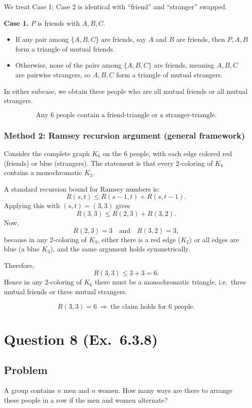 \documentclass[12pt]{article}
\begin{document}
We treat Case 1; Case 2 is identical with ``friend'' and ``stranger'' swapped.

\medskip
\noindent\textbf{Case 1.} $P$ is friends with $A,B,C$.
\begin{itemize}[leftmargin=*]
\item If any pair among $\{A,B,C\}$ are friends, say $A$ and $B$ are friends, then $P,A,B$ form a triangle of mutual friends.
\item Otherwise, none of the pairs among $\{A,B,C\}$ are friends, meaning $A,B,C$ are pairwise strangers, so $A,B,C$ form a triangle of mutual strangers.
\end{itemize}
In either subcase, we obtain three people who are all mutual friends or all mutual strangers.

\[
\boxed{\text{Any }6\text{ people contain a friend-triangle or a stranger-triangle.}}
\]

\subsubsection{Method 2: Ramsey recursion argument (general framework)}
Consider the complete graph $K_6$ on the $6$ people, with each edge colored red (friends) or blue (strangers). The statement is that every 2-coloring of $K_6$ contains a monochromatic $K_3$.

A standard recursion bound for Ramsey numbers is:
\[
R(s,t) \le R(s-1,t) + R(s,t-1).
\]
Applying this with $(s,t)=(3,3)$ gives
\[
R(3,3) \le R(2,3) + R(3,2).
\]
Now,
\[
R(2,3)=3 \quad\text{and}\quad R(3,2)=3,
\]
because in any 2-coloring of $K_3$, either there is a red edge ($K_2$) or all edges are blue (a blue $K_3$), and the same argument holds symmetrically.

Therefore,
\[
R(3,3) \le 3+3 = 6.
\]
Hence in any 2-coloring of $K_6$ there must be a monochromatic triangle, i.e.\ three mutual friends or three mutual strangers.

\[
\boxed{R(3,3)=6\ \Rightarrow\ \text{the claim holds for }6\text{ people.}}
\]

\newpage

\section{Question 8 (Ex.\ 6.3.8)}
\subsection{Problem}
A group contains $n$ men and $n$ women. How many ways are there to arrange these people in a row if the men and women alternate?
\end{document}
